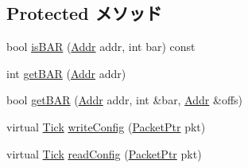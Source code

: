 \subsection*{Protected メソッド}
\begin{DoxyCompactItemize}
\item 
bool \hyperlink{classPciDevice_ac8b92b4f9f4b7ec34ee7994cabdddc67}{isBAR} (\hyperlink{base_2types_8hh_af1bb03d6a4ee096394a6749f0a169232}{Addr} addr, int bar) const 
\item 
int \hyperlink{classPciDevice_ad7fbff3ce8627dac12313ed7ac1ea44a}{getBAR} (\hyperlink{base_2types_8hh_af1bb03d6a4ee096394a6749f0a169232}{Addr} addr)
\item 
bool \hyperlink{classPciDevice_a0678ae6a6ecde363fbe15ab17ebce109}{getBAR} (\hyperlink{base_2types_8hh_af1bb03d6a4ee096394a6749f0a169232}{Addr} addr, int \&bar, \hyperlink{base_2types_8hh_af1bb03d6a4ee096394a6749f0a169232}{Addr} \&offs)
\item 
virtual \hyperlink{base_2types_8hh_a5c8ed81b7d238c9083e1037ba6d61643}{Tick} \hyperlink{classPciDevice_aac7b61a78530109bfa20923a53064bbf}{writeConfig} (\hyperlink{classPacket}{PacketPtr} pkt)
\item 
virtual \hyperlink{base_2types_8hh_a5c8ed81b7d238c9083e1037ba6d61643}{Tick} \hyperlink{classPciDevice_a9dfb5284eadd79fffef97ba1bd69f3c4}{readConfig} (\hyperlink{classPacket}{PacketPtr} pkt)
\end{DoxyCompactItemize}

